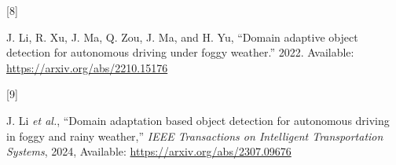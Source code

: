 \documentclass[
  11pt,
]{article}
\newlength{\cslhangindent}
\newlength{\csllabelwidth}
\newlength{\cslentryspacingunit} %
\newenvironment{CSLReferences}[2] %
 {%
  \setlength{\parindent}{0pt}
  \ifodd #1
  \let\oldpar\par
  \def\par{\hangindent=\cslhangindent\oldpar}
  \fi
  \setlength{\parskip}{#2\cslentryspacingunit}
 }%
 {}
\newcommand{\CSLLeftMargin}[1]{\parbox[t]{\csllabelwidth}{#1}}
\newcommand{\CSLRightInline}[1]{\parbox[t]{\linewidth - \csllabelwidth}{#1}\break}
\begin{document}
\begin{CSLReferences}{0}{0}
\leavevmode{}%
\CSLLeftMargin{{[}8{]} }%
\CSLRightInline{J. Li, R. Xu, J. Ma, Q. Zou, J. Ma, and H. Yu, {``Domain
adaptive object detection for autonomous driving under foggy weather.''}
2022. Available: \url{https://arxiv.org/abs/2210.15176}}

\leavevmode{}%
\CSLLeftMargin{{[}9{]} }%
\CSLRightInline{J. Li \emph{et al.}, {``Domain adaptation based object
detection for autonomous driving in foggy and rainy weather,''}
\emph{IEEE Transactions on Intelligent Transportation Systems}, 2024,
Available: \url{https://arxiv.org/abs/2307.09676}}

\end{CSLReferences}
\end{document}
